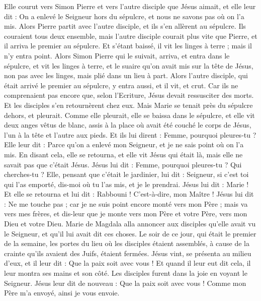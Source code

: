 \begin{multicols}{2}
Elle courut vers Simon Pierre et vers l'autre disciple que Jésus aimait, et elle leur dit : On a enlevé le Seigneur hors du sépulcre, et nous ne savons pas où on l'a mis.
Alors Pierre partit avec l'autre disciple, et ils s'en allèrent au sépulcre.
Ils couraient tous deux ensemble, mais l'autre disciple courait plus vite que Pierre, et il arriva le premier au sépulcre.
Et s'étant baissé, il vit les linges à terre ; mais il n'y entra point.
Alors Simon Pierre qui le suivait, arriva, et entra dans le sépulcre, et vit les linges à terre,
et le suaire qu'on avait mis sur la tête de Jésus, non pas avec les linges, mais plié dans un lieu à part.
Alors l'autre disciple, qui était arrivé le premier au sépulcre, y entra aussi, et il vit, et crut.
Car ils ne comprenaient pas encore que, selon l'Ecriture, Jésus devait ressusciter des morts.
Et les disciples s'en retournèrent chez eux.
Mais Marie se tenait près du sépulcre dehors, et pleurait. Comme elle pleurait, elle se baissa dans le sépulcre,
et elle vit deux anges vêtus de blanc, assis à la place où avait été couché le corps de Jésus, l'un à la tête et l'autre aux pieds.
Et ils lui dirent : Femme, pourquoi pleures-tu ? Elle leur dit : Parce qu'on a enlevé mon Seigneur, et je ne sais point où on l'a mis.
En disant cela, elle se retourna, et elle vit Jésus qui était là, mais elle ne savait pas que c'était Jésus.
Jésus lui dit : Femme, pourquoi pleures-tu ? Qui cherches-tu ? Elle, pensant que c'était le jardinier, lui dit : Seigneur, si c'est toi qui l'as emporté, dis-moi où tu l'as mis, et je le prendrai.
Jésus lui dit : Marie ! Et elle se retourna et lui dit : Rabbouni ! C'est-à-dire, mon Maître !
Jésus lui dit : Ne me touche pas ; car je ne suis point encore monté vers mon Père ; mais va vers mes frères, et dis-leur que je monte vers mon Père et votre Père, vers mon Dieu et votre Dieu.
Marie de Magdala alla annoncer aux disciples qu'elle avait vu le Seigneur, et qu'il lui avait dit ces choses.
Le soir de ce jour, qui était le premier de la semaine, les portes du lieu où les disciples étaient assemblés, à cause de la crainte qu'ils avaient des Juifs, étaient fermées. Jésus vint, se présenta au milieu d'eux, et il leur dit : Que la paix soit avec vous !
Et quand il leur eut dit cela, il leur montra ses mains et son côté. Les disciples furent dans la joie en voyant le Seigneur.
Jésus leur dit de nouveau : Que la paix soit avec vous ! Comme mon Père m'a envoyé, ainsi je vous envoie.

\end{multicols}
